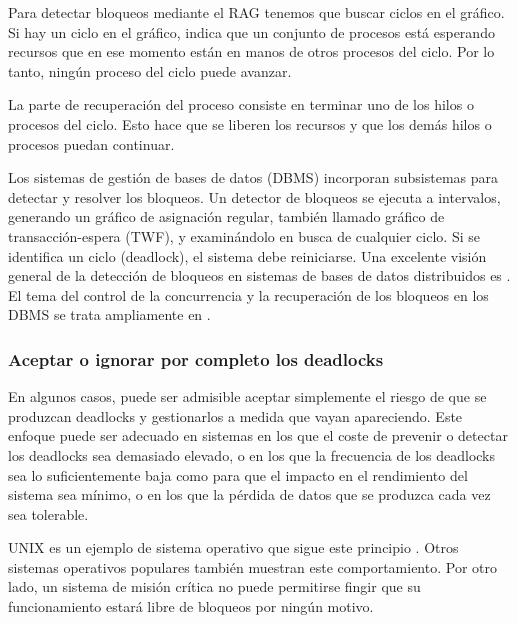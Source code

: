 Para detectar bloqueos mediante el \acrshort{RAG} tenemos que buscar ciclos en el gráfico.
Si hay un ciclo en el gráfico, indica que un conjunto de procesos está esperando recursos que en ese
momento están en manos de otros procesos del ciclo. Por lo tanto, ningún proceso del ciclo
puede avanzar.

La parte de recuperación del proceso consiste en terminar uno de los hilos o procesos del ciclo.
Esto hace que se liberen los recursos y que los demás hilos o procesos puedan continuar.

Los sistemas de gestión de bases de datos (\acrfull{DBMS}) incorporan subsistemas para detectar y
resolver los bloqueos. Un detector de bloqueos se ejecuta a intervalos, generando un gráfico de
asignación regular, también llamado gráfico de transacción-espera (\acrfull{TWF}), y examinándolo en
busca de cualquier ciclo. Si se identifica un ciclo (deadlock), el sistema debe reiniciarse. Una
excelente visión general de la detección de bloqueos en sistemas de bases de datos distribuidos
es \cite{knapp1987deadlock}. El tema del control de la concurrencia y la recuperación de los bloqueos en
los \acrshort{DBMS} se trata ampliamente en \cite{bernstein1987concurrency}.

\subsubsection{Aceptar o ignorar por completo los deadlocks}

En algunos casos, puede ser admisible aceptar simplemente el riesgo de que se produzcan
deadlocks y gestionarlos a medida que vayan apareciendo. Este enfoque puede ser adecuado
en sistemas en los que el coste de prevenir o detectar los deadlocks sea demasiado
elevado, o en los que la frecuencia de los deadlocks sea lo suficientemente baja como
para que el impacto en el rendimiento del sistema sea mínimo, o en los que la pérdida de datos
que se produzca cada vez sea tolerable.

UNIX es un ejemplo de sistema operativo que sigue este principio \cite[p. 477]{shibu2016}. Otros
sistemas operativos populares también muestran este comportamiento. Por otro lado, un
sistema de misión crítica no puede permitirse fingir que su funcionamiento estará libre de bloqueos por
ningún motivo.